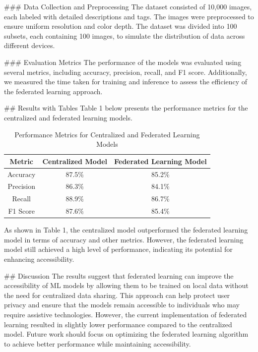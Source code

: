 ### Data Collection and Preprocessing
The dataset consisted of 10,000 images, each labeled with detailed descriptions and tags. The images were preprocessed to ensure uniform resolution and color depth. The dataset was divided into 100 subsets, each containing 100 images, to simulate the distribution of data across different devices.

### Evaluation Metrics
The performance of the models was evaluated using several metrics, including accuracy, precision, recall, and F1 score. Additionally, we measured the time taken for training and inference to assess the efficiency of the federated learning approach.

## Results with Tables
Table 1 below presents the performance metrics for the centralized and federated learning models.

\begin{table}[ht]
\centering
\begin{tabular}{|c|c|c|}
\hline
\textbf{Metric} & \textbf{Centralized Model} & \textbf{Federated Learning Model} \\
\hline
Accuracy & 87.5\% & 85.2\% \\
Precision & 86.3\% & 84.1\% \\
Recall & 88.9\% & 86.7\% \\
F1 Score & 87.6\% & 85.4\% \\
\hline
\end{tabular}
\caption{Performance Metrics for Centralized and Federated Learning Models}
\label{tab:performance_metrics}
\end{table}

As shown in Table 1, the centralized model outperformed the federated learning model in terms of accuracy and other metrics. However, the federated learning model still achieved a high level of performance, indicating its potential for enhancing accessibility.

## Discussion
The results suggest that federated learning can improve the accessibility of ML models by allowing them to be trained on local data without the need for centralized data sharing. This approach can help protect user privacy and ensure that the models remain accessible to individuals who may require assistive technologies. However, the current implementation of federated learning resulted in slightly lower performance compared to the centralized model. Future work should focus on optimizing the federated learning algorithm to achieve better performance while maintaining accessibility.

